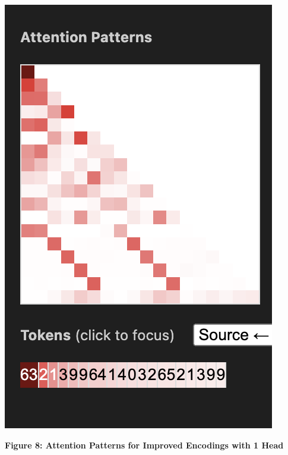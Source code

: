 \documentclass{article}
\begin{document}
\begin{center}
    \includegraphics[scale=0.4]{images/att_encoding_1hd3.png}

    \textbf{Figure 8: Attention Patterns for Improved Encodings with 1 Head}
\end{center}
\end{document}
